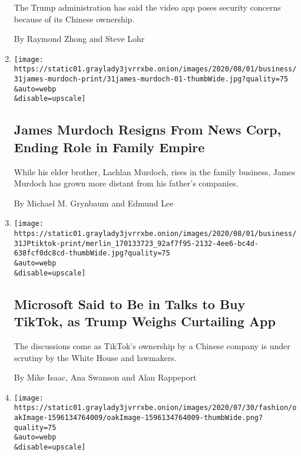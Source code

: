 \begin{enumerate}
  The Trump administration has said the video app poses security
  concerns because of its Chinese ownership.

  By Raymond Zhong and Steve Lohr
\item
  \href{/2020/07/31/business/media/james-murdoch-resigns-news-corp.html}{}

  \texttt{[image: https://static01.graylady3jvrrxbe.onion/images/2020/08/01/business/31james-murdoch-print/31james-murdoch-01-thumbWide.jpg?quality=75\\\&auto=webp\\\&disable=upscale]}

  \hypertarget{james-murdoch-resigns-from-news-corp-ending-role-in-family-empire}{%
  \subsection{James Murdoch Resigns From News Corp, Ending Role in
  Family
  Empire}\label{james-murdoch-resigns-from-news-corp-ending-role-in-family-empire}}

  While his elder brother, Lachlan Murdoch, rises in the family
  business, James Murdoch has grown more distant from his father's
  companies.

  By Michael M. Grynbaum and Edmund Lee
\item
  \href{/2020/07/31/technology/tiktok-microsoft.html}{}

  \texttt{[image: https://static01.graylady3jvrrxbe.onion/images/2020/08/01/business/31JPtiktok-print/merlin\_170133723\_92af7f95-2132-4ee6-bc4d-638fcf0dc8cd-thumbWide.jpg?quality=75\\\&auto=webp\\\&disable=upscale]}

  \hypertarget{microsoft-said-to-be-in-talks-to-buy-tiktok-as-trump-weighs-curtailing-app}{%
  \subsection{Microsoft Said to Be in Talks to Buy TikTok, as Trump
  Weighs Curtailing
  App}\label{microsoft-said-to-be-in-talks-to-buy-tiktok-as-trump-weighs-curtailing-app}}

  The discussions come as TikTok's ownership by a Chinese company is
  under scrutiny by the White House and lawmakers.

  By Mike Isaac, Ana Swanson and Alan Rappeport
\item
  \href{/2020/07/31/style/trump-twitter-barstool-sports.html}{}

  \texttt{[image: https://static01.graylady3jvrrxbe.onion/images/2020/07/30/fashion/oakImage-1596134764009/oakImage-1596134764009-thumbWide.png?quality=75\\\&auto=webp\\\&disable=upscale]}


\end{enumerate}
